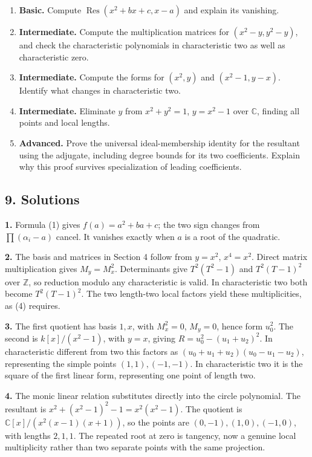 \documentclass[
]{article}
\providecommand{\tightlist}{%
  \setlength{\itemsep}{0pt}\setlength{\parskip}{0pt}}
\begin{document}
\begin{enumerate}
\def\labelenumi{\arabic{enumi}.}
\tightlist
\item
  \textbf{Basic.} Compute \(\operatorname{Res}(x^2+bx+c,x-a)\) and
  explain its vanishing.
\item
  \textbf{Intermediate.} Compute the multiplication matrices for
  \((x^2-y,y^2-y)\), and check the characteristic polynomials in
  characteristic two as well as characteristic zero.
\item
  \textbf{Intermediate.} Compute the forms for \((x^2,y)\) and
  \((x^2-1,y-x)\). Identify what changes in characteristic two.
\item
  \textbf{Intermediate.} Eliminate \(y\) from \(x^2+y^2=1\), \(y=x^2-1\)
  over \(\mathbb C\), finding all points and local lengths.
\item
  \textbf{Advanced.} Prove the universal ideal-membership identity for
  the resultant using the adjugate, including degree bounds for its two
  coefficients. Explain why this proof survives specialization of
  leading coefficients.
\end{enumerate}

\subsection{9. Solutions}\label{solutions}

\textbf{1.} Formula (1) gives \(f(a)=a^2+ba+c\); the two sign changes
from \(\prod(\alpha_i-a)\) cancel. It vanishes exactly when \(a\) is a
root of the quadratic.

\textbf{2.} The basis and matrices in Section 4 follow from \(y=x^2\),
\(x^4=x^2\). Direct matrix multiplication gives \(M_y=M_x^2\).
Determinants give \(T^2(T^2-1)\) and \(T^2(T-1)^2\) over \(\mathbb Z\),
so reduction modulo any characteristic is valid. In characteristic two
both become \(T^2(T-1)^2\). The two length-two local factors yield these
multiplicities, as (4) requires.

\textbf{3.} The first quotient has basis \(1,x\), with \(M_x^2=0\),
\(M_y=0\), hence form \(u_0^2\). The second is \(k[x]/(x^2-1)\), with
\(y=x\), giving \(R=u_0^2-(u_1+u_2)^2\). In characteristic different
from two this factors as \((u_0+u_1+u_2)(u_0-u_1-u_2)\), representing
the simple points \((1,1),(-1,-1)\). In characteristic two it is the
square of the first linear form, representing one point of length two.

\textbf{4.} The monic linear relation substitutes directly into the
circle polynomial. The resultant is \(x^2+(x^2-1)^2-1=x^2(x^2-1)\). The
quotient is \(\mathbb C[x]/(x^2(x-1)(x+1))\), so the points are
\((0,-1),(1,0),(-1,0)\), with lengths \(2,1,1\). The repeated root at
zero is tangency, now a genuine local multiplicity rather than two
separate points with the same projection.
\end{document}
